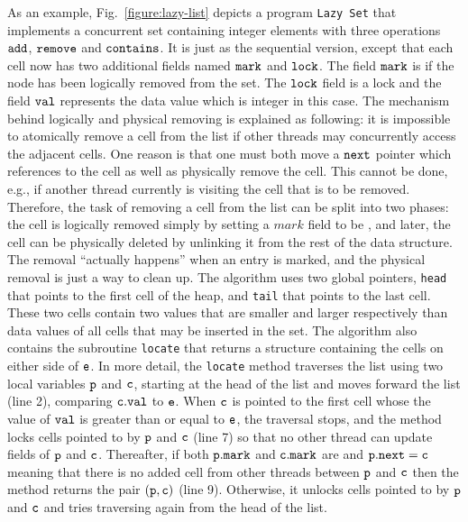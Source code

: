 As an example, Fig.~\ref{figure:lazy-list} depicts a program
{\tt Lazy Set} \cite{Lazyset}
that implements a concurrent set containing integer
elements with three operations $\tt add$, $\tt remove$ and $\tt contains$.
It is just as the sequential version,
except that each cell now has two additional fields named ${\tt mark}$ and ${\tt lock}$. The field $\tt mark$ is \true\; if
the node has been logically removed from the set. The ${\tt lock}$ field is a lock and the field ${\tt val}$ represents the data value which is integer in this case. The
mechanism behind logically and physical removing is explained as following: it is impossible to atomically remove a cell from the list if other threads may concurrently access the adjacent cells. One reason is that one must both move a $\tt next$ pointer which references to the cell as well as physically remove the cell. This cannot be done, e.g., if another thread currently is visiting the cell that is to be removed. Therefore, the task of removing a cell from the list  can be split into two phases: the cell is logically removed simply by setting a $mark$ field to be \true, and later, the cell can be physically deleted by unlinking it from the rest of the data structure. The removal “actually happens” when an entry is marked, and the physical removal is just a way to clean up.
The algorithm uses two global pointers, {\tt head} that points to  the first cell of the heap, and {\tt tail} that points to the last cell.  
These two cells contain two values that are smaller 
and larger respectively than data values of all cells that may be                     
inserted in the set. The algorithm also contains the subroutine {\tt locate} that returns a structure containing the cells on either side of $\tt e$. In more detail, the {\tt locate} method traverses the list using two local variables ${\tt p}$ and $\tt c$, starting at the head of the list and moves forward the list (line 2), comparing ${\tt c.val}$ to ${\tt e}$. When $\tt c$ is pointed to the
first cell whose the value of  $\tt val$ is greater than or equal to $\tt e$, the traversal stops, and the
method locks cells pointed to by $\tt p$ and $\tt c$ (line 7) so that no other thread can update fields of $\tt p$ and $\tt c$. Thereafter, if both $\tt p.mark$ and $\tt c.mark$ are \false \; and ${\tt p.next = c}$ meaning that there is no added cell from other threads between $\tt p$ and $\tt c$ then the method returns the pair $\tt (p,c)$ (line 9). Otherwise, it unlocks cells pointed to by $\tt p$ and $\tt c$ and tries traversing again from the head of the list.




